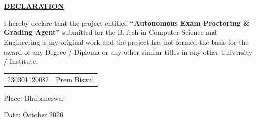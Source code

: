 \documentclass{article}
\begin{document}
\section*{}
\begin{center}
\underline{\LARGE \textbf{DECLARATION}}\\[1.5cm]
\end{center}
\large{I hereby declare that the project entitled \textbf{``Autonomous Exam Proctoring \& Grading Agent''} submitted for the B.Tech in Computer Science and Engineering is my original work and the project has not formed the basis for the award of any Degree / Diploma or any other similar titles in any other University / Institute.}\\[0.5cm]
\begin{flushright}
\begin{table}[h]
\begin{tabular}{lr}
230301120082 & Prem Biswal\\
\end{tabular}
\end{table}
\end{flushright}

\begin{flushleft}
Place: Bhubaneswar
\end{flushleft}
\begin{flushleft}
Date: October 2026
\end{flushleft}

\vfill
\newpage

\end{document}
